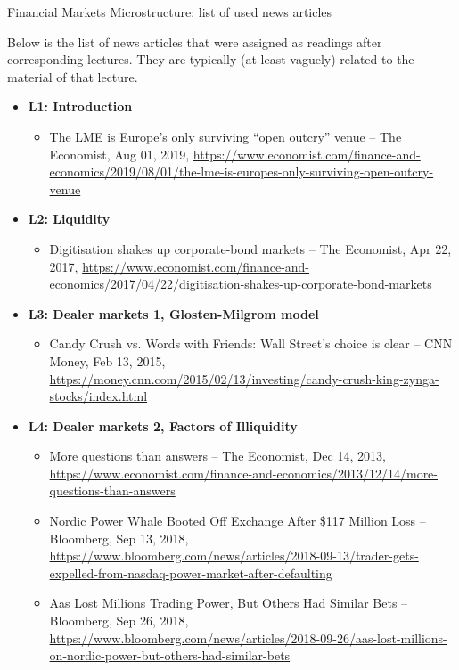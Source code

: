 \documentclass{article}
\begin{document}
\begin{center}
	{\huge Financial Markets Microstructure: list of used news articles}
\end{center}
\bigskip

Below is the list of news articles that were assigned as readings after corresponding lectures. They are typically (at least vaguely) related to the material of that lecture.

\begin{itemize}
	\item \textbf{L1: Introduction}
	\begin{itemize}
		\item \raggedright The LME is Europe’s only surviving ``open outcry'' venue -- The Economist, Aug 01, 2019, \url{https://www.economist.com/finance-and-economics/2019/08/01/the-lme-is-europes-only-surviving-open-outcry-venue}
	\end{itemize}
	
	\item \textbf{L2: Liquidity}
	\begin{itemize}
		\item \raggedright Digitisation shakes up corporate-bond markets -- The Economist, Apr 22, 2017, \url{https://www.economist.com/finance-and-economics/2017/04/22/digitisation-shakes-up-corporate-bond-markets}
	\end{itemize}
	
	\item \textbf{L3: Dealer markets 1, Glosten-Milgrom model}
	\begin{itemize}
		\item \raggedright Candy Crush vs. Words with Friends: Wall Street's choice is clear -- CNN Money, Feb 13, 2015, \url{https://money.cnn.com/2015/02/13/investing/candy-crush-king-zynga-stocks/index.html}
	\end{itemize}
	
	\item \textbf{L4: Dealer markets 2, Factors of Illiquidity}
	\begin{itemize}
		\item \raggedright More questions than answers -- The Economist, Dec 14, 2013,  \url{https://www.economist.com/finance-and-economics/2013/12/14/more-questions-than-answers}
		\item \raggedright Nordic Power Whale Booted Off Exchange After \$117 Million Loss -- Bloomberg, Sep 13, 2018, \url{https://www.bloomberg.com/news/articles/2018-09-13/trader-gets-expelled-from-nasdaq-power-market-after-defaulting}
		\item \raggedright Aas Lost Millions Trading Power, But Others Had Similar Bets -- Bloomberg, Sep 26, 2018, \url{https://www.bloomberg.com/news/articles/2018-09-26/aas-lost-millions-on-nordic-power-but-others-had-similar-bets}
	\end{itemize}
	

\end{itemize}
\end{document}
